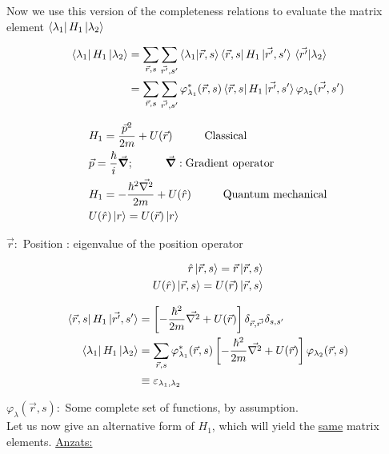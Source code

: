 \noindent Now we use this version of the completeness relations to evaluate the matrix element $\bra{\lambda_1} H_1 \ket{\lambda_2}$

\begin{align}
	\bra{\lambda_1} H_1 \ket{\lambda_2} &= \sum_{\vec{r},s} \sum_{\vec{r'},s'} \braket{\lambda_1}{\vec{r},s} \bra{\vec{r},s} H_1 \ket*{\vec{r'},s'} \braket*{\vec{r'}}{\lambda_2}\\
	&=  \sum_{\vec{r},s} \sum_{\vec{r'},s'} \varphi_{\lambda_1}^* (\vec{r},s)  \bra{\vec{r},s} H_1 \ket*{\vec{r'},s'} \varphi_{\lambda_2} (\vec{r'},s') \nonumber
\end{align}

\begin{align}
	&H_1 = \frac{\vec{p}^2}{2m}+ U(\vec{r}) \hspace{1cm} \text{Classical}\\
	&\vec{p}= \frac{\hbar}{i} \vec{\gradient}  ;  \hspace{1cm} \vec{\gradient}: \text{Gradient operator}\\
	&H_1 =  - \frac{\hbar^2 \vec{\laplacian}}{2m} + U(\hat{r}) \hspace{1cm} \text{Quantum mechanical}\\
	& U(\hat{r}) \ket{r} = U(\vec{r})\ket{r}
\end{align}

\noindent $\vec{r}:$ Position : eigenvalue of the position operator

\begin{align}
	\hat{r} \ket{\vec{r},s}= \vec{r} \ket{\vec{r}, s}\\
	U(\hat{r}) \ket{\vec{r},s}= U(\vec{r}) \ket{\vec{r},s}
\end{align}


\begin{align}
	\bra{\vec{r},s} H_1 \ket*{\vec{r'},s'} &= \left[-\frac{\hbar^2}{2m} \vec{\laplacian}+ U(\vec{r}) \right] \delta_{\vec{r}, \vec{r'}} \delta_{s,s'}\\
	\bra{\lambda_1} H_1 \ket{\lambda_2} &= \sum_{\vec{r},s} \varphi_{\lambda_1}^* (\vec{r},s) \left[-\frac{\hbar^2}{2m} \vec{\laplacian}+ U(\vec{r}) \right] \varphi_{\lambda_2} (\vec{r},s)\\
	&\equiv \varepsilon_{\lambda_1, \lambda_2} \nonumber
\end{align}

\noindent $\varphi_\lambda (\vec{r},s): $ Some complete set of functions, by assumption.\\
\linebreak
\noindent Let us now give an alternative form of $H_1$, which will yield the \uline{same} matrix elements.
\linebreak
\noindent \uline{Anzats:}

